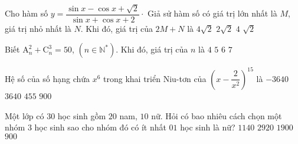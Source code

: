 \begin{ex}%
Cho hàm số $y=\dfrac{\sin x-\cos x+\sqrt{2}}{\sin x+\cos x+2}\cdot$ Giả sử hàm số có giá trị lớn nhất là $M$, giá trị nhỏ nhất là $N$. Khi đó, giá trị của $2M+N$ là 
\choice
{\True $4\sqrt{2}$}
{$2\sqrt{2}$}
{$4$}
{$\sqrt{2}$}
\end{ex}

\begin{ex}%
Biết $\mathrm{A}^2_n+\mathrm{C}^3_n=50$, $(n\in\mathbb{N}^\ast)$. Khi đó, giá trị của $n$ là 
\choice
{$4$}
{$5$}
{\True $6$}
{$7$}
\end{ex}

\begin{ex}%
Hệ số của số hạng chứa $x^6$ trong khai triển Niu-tơn của $\left(x-\dfrac{2}{x^2}\right)^{15}$ là 
\choice
{\True $-3640$}
{$3640$}
{$455$}
{$900$}
\end{ex}

\begin{ex}%
Một lớp có $30$ học sinh gồm $20$ nam, $10$ nữ. Hỏi có bao nhiêu cách chọn một nhóm $3$ học sinh sao cho nhóm đó có ít nhất $01$ học sinh là nữ?
\choice
{$1140$}
{\True $2920$}
{$1900$}
{$900$}
\end{ex}

